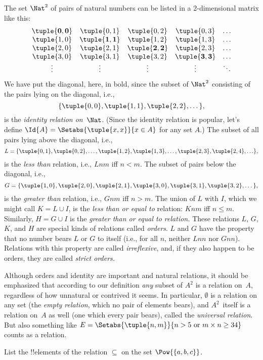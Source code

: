 \documentclass[../../../include/open-logic-section]{subfiles}
\begin{document}
\begin{ex}
The set $\Nat^{2}$ of pairs of natural numbers can be listed in a
2-dimensional matrix like this:
\[
  \begin{array}{ccccc}
  \mathbf{\tuple{ 0,0 }} & \tuple{ 0,1 } &
    \tuple{ 0,2 } & \tuple{ 0,3 } & \ldots\\
  \tuple{ 1,0 } & \mathbf{\tuple{ 1,1 }} &
    \tuple{ 1,2 } & \tuple{ 1,3 } & \ldots\\
  \tuple{ 2,0 } & \tuple{ 2,1 } &
    \mathbf{\tuple{ 2,2 }} & \tuple{ 2,3 } & \ldots\\
  \tuple{ 3,0 } & \tuple{ 3,1 } & \tuple{ 3,2 } &
    \mathbf{\tuple{ 3,3 }} & \ldots\\
  \vdots & \vdots & \vdots & \vdots & \mathbf{\ddots}
  \end{array}
\]
We have put the diagonal, here, in bold, since the subset of $\Nat^2$
consisting of the pairs lying on the diagonal, i.e.,
\[
  \{\tuple{0,0 }, \tuple{ 1,1 }, \tuple{ 2,2 }, \dots\},
  \]
is the \emph{identity relation on}~$\Nat$. (Since the identity
relation is popular, let's define $\Id{A}=\Setabs{\tuple{ x,x }}{x \in
A}$ for any set $A$.) The subset of all pairs lying above the
diagonal, i.e.,
\[
  L = \{\tuple{ 0,1 },\tuple{ 0,2 },\ldots,\tuple{ 1,2 },
  \tuple{ 1,3 }, \dots, \tuple{ 2,3 }, \tuple{ 2,4 },\ldots\},
\]
is the \emph{less than} relation, i.e., $Lnm$ iff $n<m$. The subset of
pairs below the diagonal, i.e.,
\[
  G=\{ \tuple{ 1,0 },\tuple{ 2,0 },\tuple{
    2,1 }, \tuple{ 3,0 },\tuple{ 3,1 },\tuple{ 3,2 }, \dots\},
\]
is the \emph{greater than} relation, i.e., $Gnm$ iff $n>m$. The union
of $L$ with $I$, which we might call $K=L\cup I$, is the \emph{less
than or equal to} relation: $Knm$ iff $n \le m$. Similarly, $H=G \cup
I$ is the \emph{greater than or equal to relation.} These relations
$L$, $G$, $K$, and $H$ are special kinds of relations called
\emph{orders}. $L$ and $G$ have the property that no number bears $L$
or $G$ to itself (i.e., for all $n$, neither $Lnn$ nor $Gnn$).
Relations with this property are called \emph{irreflexive}, and, if
they also happen to be orders, they are called \emph{strict orders.}
\end{ex}

\begin{explain}
Although orders and identity are important and natural relations, it
should be emphasized that according to our definition \emph{any}
subset of $A^{2}$ is a relation on~$A$, regardless of how unnatural or
contrived it seems. In particular, $\emptyset$ is a relation on any
set (the \emph{empty relation}, which no pair of elements bears), and
$A^{2}$~itself is a relation on~$A$ as well (one which every pair
bears), called the \emph{universal relation}. But also something like
$E=\Setabs{\tuple{n, m}}{n>5 \text{ or } m \times n \ge 34}$ counts as
a relation.
\end{explain}
  
\begin{prob}
  List the !!{element}s of the relation $\subseteq$ on the set
  $\Pow{\{a, b, c\}}$.
\end{prob}
\end{document}
